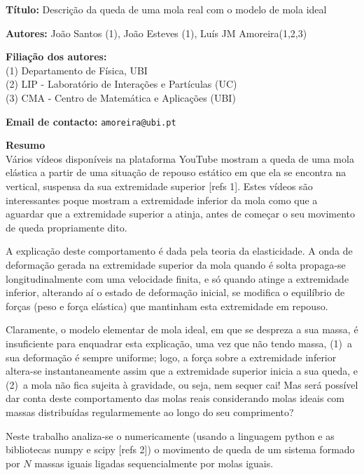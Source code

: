 \documentclass{report}
\begin{document}
\textbf{Título: }Descrição da queda de uma mola real com o modelo de mola ideal

\vspace{.5em}
\textbf{Autores: }João Santos (1), João Esteves (1), Luís JM Amoreira(1,2,3)

\vspace{.5em}
\textbf{Filiação dos autores: }\\
(1) Departamento de Física, UBI\\
(2) LIP - Laboratório de Interações e Partículas (UC)\\
(3) CMA - Centro de Matemática e Aplicações (UBI)

\vspace{.5em}
\textbf{Email de contacto: }\texttt{amoreira@ubi.pt}

\vspace{.5em}
\textbf{Resumo}\\
  Vários vídeos disponíveis na plataforma YouTube mostram a queda de uma mola
  elástica a partir de uma situação de repouso estático em que ela se encontra
  na vertical, suspensa da sua extremidade superior [refs 1]. Estes vídeos são
  interessantes poque mostram a extremidade inferior da mola como que a aguardar
  que a extremidade superior a atinja, antes de começar o seu movimento de queda
  propriamente dito. 
	
  A explicação deste comportamento é dada pela teoria da elasticidade.  A onda
  de deformação gerada na extremidade superior da mola quando é solta propaga-se
  longitudinalmente com uma velocidade finita, e só quando atinge a extremidade
  inferior, alterando aí o estado de deformação inicial, se modifica o
  equilíbrio de forças (peso e força elástica) que mantinham esta extremidade em
  repouso.
	
  Claramente, o modelo elementar de mola ideal, em que se despreza a sua massa,
  é insuficiente para enquadrar esta explicação, uma vez que não tendo massa,
  (1)~a sua deformação é sempre uniforme; logo, a força sobre a extremidade
  inferior altera-se instantaneamente assim que a extremidade superior inicia a
  sua queda, e (2)~a mola não fica sujeita à gravidade, ou seja, nem sequer cai!
  Mas será possível dar conta deste comportamento das molas reais considerando
  molas ideais com massas distribuídas regularmemente ao longo do seu
  comprimento?

  Neste trabalho analiza-se o numericamente (usando a linguagem python e as
  bibliotecas numpy e scipy [refs 2]) o movimento de queda de um sistema formado por $N$
  massas iguais ligadas sequencialmente por molas iguais.
\end{document}
